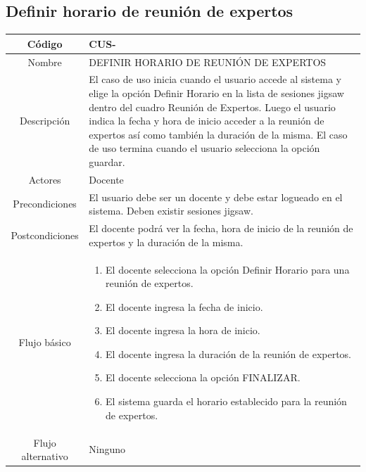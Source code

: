 \subsection{Definir horario de reunión de expertos}
\begin{longtable}{|c|L{10cm}|}
	\toprule[0.8mm]
	Código &  CUS-\casodeuso\\  \midrule
	Nombre &  DEFINIR HORARIO DE REUNIÓN DE EXPERTOS\\  \midrule
	Descripción & El caso de uso inicia cuando el usuario accede al sistema y elige la opción Definir Horario en la lista de sesiones jigsaw dentro del cuadro Reunión de Expertos. Luego el usuario indica la fecha y hora de inicio acceder a la reunión de expertos así como también la duración de la misma. El caso de uso termina cuando el usuario selecciona la opción guardar. \\  \midrule
	Actores &  Docente\\  \midrule
	Precondiciones & El usuario debe ser un docente y debe estar logueado en el sistema. Deben existir sesiones jigsaw. \\  \midrule
	Postcondiciones & El docente podrá ver la fecha, hora de inicio de la reunión de expertos y la duración de la misma. \\  \midrule
	Flujo básico & \begin{enumerate}
		\item El docente selecciona la opción Definir Horario para una reunión de expertos.
		\item El docente ingresa la fecha de inicio.
		\item El docente ingresa la hora de inicio.
		\item El docente ingresa la duración de la reunión de expertos.
		\item El docente selecciona la opción FINALIZAR.
		\item El sistema guarda el horario establecido para la reunión de expertos.
	\end{enumerate}
	\\  \midrule
	Flujo alternativo & Ninguno \\  \bottomrule[0.8mm]
\end{longtable}
\clearpage
